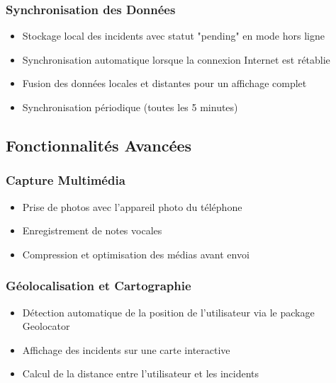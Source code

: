 \documentclass[12pt,a4paper]{article}
\begin{document}
\subsubsection{Synchronisation des Données}
\begin{itemize}
    \item Stockage local des incidents avec statut "pending" en mode hors ligne
    \item Synchronisation automatique lorsque la connexion Internet est rétablie
    \item Fusion des données locales et distantes pour un affichage complet
    \item Synchronisation périodique (toutes les 5 minutes)
\end{itemize}

\subsection{Fonctionnalités Avancées}

\subsubsection{Capture Multimédia}
\begin{itemize}
    \item Prise de photos avec l'appareil photo du téléphone
    \item Enregistrement de notes vocales
    \item Compression et optimisation des médias avant envoi
\end{itemize}

\subsubsection{Géolocalisation et Cartographie}
\begin{itemize}
    \item Détection automatique de la position de l'utilisateur via le package Geolocator
    \item Affichage des incidents sur une carte interactive
    \item Calcul de la distance entre l'utilisateur et les incidents
\end{itemize}
\end{document}
